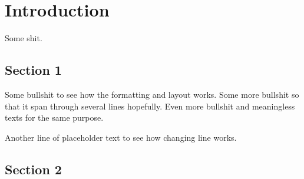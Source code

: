 \chapter{Introduction}

Some shit.

\section{Section 1}

Some bullshit to see how the formatting and layout works. Some more bullshit so that it span through several lines hopefully. Even more bullshit and meaningless texts for the same purpose.

Another line of placeholder text to see how changing line works.

\section{Section 2}